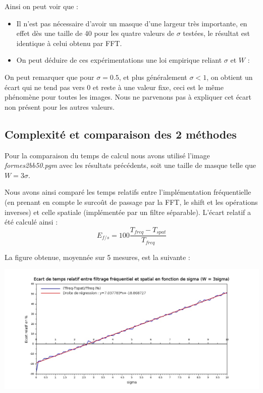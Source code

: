 \documentclass[a4,12pt]{article}
\begin{document}
\noindent
Ainsi on peut voir que :
\begin{itemize}
	\item Il n'est pas nécessaire d'avoir un masque d'une largeur très importante, en effet dès une taille de 40 pour les quatre valeurs de $\sigma$ testées, le résultat est identique à celui obtenu par FFT.
	\item On peut déduire de ces expérimentations une loi empirique reliant $\sigma$ et $W$ :\\
	\begin{center}
	\end{center}
\end{itemize}

\vspace{1em}
On peut remarquer que pour $\sigma=0.5$, et plus généralement $\sigma < 1$, on obtient un écart qui ne tend pas vers $0$ et reste à une valeur fixe, ceci est le même phénomène pour toutes les images. Nous ne parvenons pas à expliquer cet écart non présent pour les autres valeurs.

\subsection{Complexité et comparaison des 2 méthodes}
Pour la comparaison du temps de calcul nous avons utilisé l'image \textit{formes2bb50.pgm} avec les résultats précédents, soit une taille de masque telle que $W=3\sigma$.

Nous avons ainsi comparé les temps relatifs entre l'implémentation fréquentielle (en prenant en compte le surcoût de passage par la FFT, le shift et les opérations inverses) et celle spatiale (implémentée par un filtre séparable). L'écart relatif a été calculé ainsi :\\

\begin{equation}
E_{f/s}=100\frac{T_{freq}-T_{spat}}{T_{freq}}
\end{equation}

\vspace {2em}
La figure obtenue, moyennée sur 5 mesures, est la suivante :
\begin{center}
	\includegraphics[width = 170mm]{./img/timeDiff.jpg}
\end{center}
\end{document}
